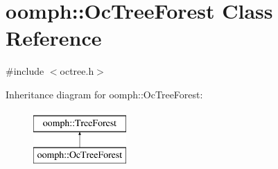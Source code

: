 \hypertarget{classoomph_1_1OcTreeForest}{}\section{oomph\+:\+:Oc\+Tree\+Forest Class Reference}
\label{classoomph_1_1OcTreeForest}


{\ttfamily \#include $<$octree.\+h$>$}

Inheritance diagram for oomph\+:\+:Oc\+Tree\+Forest\+:\begin{figure}[H]
\begin{center}
\leavevmode
\includegraphics[height=2.000000cm]{classoomph_1_1OcTreeForest}
\end{center}
\end{figure}
